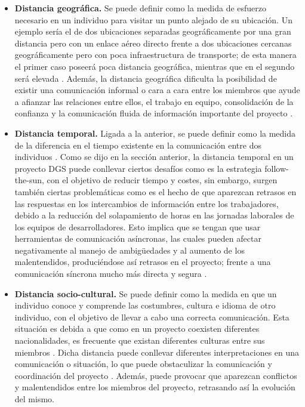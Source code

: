\begin{itemize}
	\item \textbf{Distancia geográfica.} Se puede definir como la medida de esfuerzo necesario en un individuo para visitar un punto alejado de su ubicación. Un ejemplo sería el de dos ubicaciones separadas geográficamente por una gran distancia pero con un enlace aéreo directo frente a dos ubicaciones cercanas geográficamente pero con poca infraestructura de transporte; de esta manera el primer caso poseerá poca distancia geográfica, mientras que en el segundo será elevada \cite{vizcaino2015vision}. Además, la distancia geográfica dificulta la posibilidad de existir una comunicación informal o cara a cara entre los miembros que ayude a afianzar las relaciones entre ellos, el trabajo en equipo, consolidación de la confianza y la comunicación fluida de información importante del proyecto \cite{conchuir2006exploring}.
	
	\item \textbf{Distancia temporal.} Ligada a la anterior, se puede definir como la medida de la diferencia en el tiempo existente en la comunicación entre dos individuos \cite{vizcaino2015vision}. Como se dijo en la sección anterior, la distancia temporal en un proyecto DGS puede conllevar ciertos desafíos como es la estrategia follow-the-sun, con el objetivo de reducir tiempo y costes, sin embargo, surgen también ciertas problemáticas como es el hecho de que aparezcan retrasos en las respuestas en los intercambios de información entre los trabajadores, debido a la reducción del solapamiento de horas en las jornadas laborales de los equipos de desarrolladores. Esto implica que se tengan que usar herramientas de comunicación asíncronas, las cuales pueden afectar negativamente al manejo de ambigüedades y al aumento de los malentendidos, produciéndose así retrasos en el proyecto; frente a una comunicación síncrona mucho más directa y segura \cite{conchuir2006exploring}.
	
	\item \textbf{Distancia socio-cultural.} Se puede definir como la medida en que un individuo conoce y comprende las costumbres, cultura e idioma de otro individuo, con el objetivo de llevar a cabo una correcta comunicación. Esta situación es debida a que como en un proyecto coexisten diferentes nacionalidades, es frecuente que existan diferentes culturas entre sus miembros \cite{vizcaino2015vision}. Dicha distancia puede conllevar diferentes interpretaciones en una comunicación o situación, lo que puede obstaculizar la comunicación y coordinación del proyecto \cite{conchuir2006exploring}. Además, puede provocar que aparezcan conflictos y malentendidos entre los miembros del proyecto, retrasando así la evolución del mismo.
\end{itemize}

